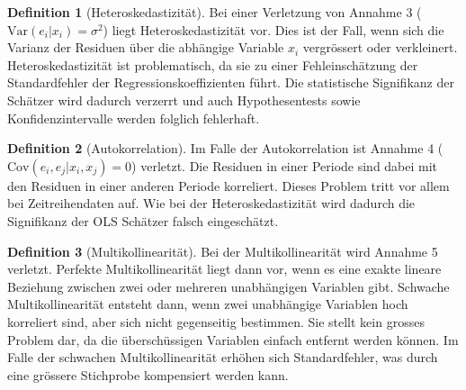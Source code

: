 \documentclass{article}
\theoremstyle{definition}
\newtheorem{definition}{Definition}
\theoremstyle{exercise}
\theoremstyle{solution}
\theoremstyle{lemma}
\begin{document}
\begin{definition}[Heteroskedastizität]
Bei einer Verletzung von Annahme 3 (\(\text{Var}(e_i|x_i)=\sigma^2\)) liegt Heteroskedastizität vor. Dies ist der Fall, wenn sich die Varianz der Residuen über die abhängige Variable \(x_i\) vergrössert oder verkleinert. Heteroskedastizität ist problematisch, da sie zu einer Fehleinschätzung der Standardfehler der Regressionskoeffizienten führt. Die statistische Signifikanz der Schätzer wird dadurch verzerrt und auch Hypothesentests sowie Konfidenzintervalle werden folglich fehlerhaft.
\end{definition}

\begin{definition}[Autokorrelation]
Im Falle der Autokorrelation ist Annahme 4 (\(\text{Cov}(e_i,e_j|x_i,x_j)=0\)) verletzt. Die Residuen in einer Periode sind dabei mit den Residuen in einer anderen Periode korreliert. Dieses Problem tritt vor allem bei Zeitreihendaten auf. Wie bei der Heteroskedastizität wird dadurch die Signifikanz der OLS Schätzer falsch eingeschätzt.
\end{definition}

\begin{definition}[Multikollinearität]
Bei der Multikollinearität wird Annahme 5 verletzt. Perfekte Multikollinearität liegt dann vor, wenn es eine exakte lineare Beziehung zwischen zwei oder mehreren unabhängigen Variablen gibt. Schwache Multikollinearität entsteht dann, wenn zwei unabhängige Variablen hoch korreliert sind, aber sich nicht gegenseitig bestimmen. Sie stellt kein grosses Problem dar, da die überschüssigen Variablen einfach entfernt werden können. Im Falle der schwachen Multikollinearität erhöhen sich Standardfehler, was durch eine grössere Stichprobe kompensiert werden kann.
\end{definition}
\end{document}
